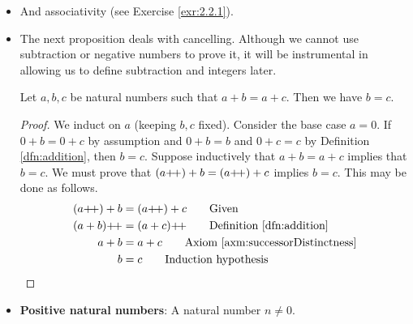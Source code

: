 \documentclass[../main.tex]{subfiles}
\begin{document}
\begin{itemize}
\begin{prp}
        For any natural numbers $n$ and $m$, $n+m=m+n$.
        \begin{proof}
            For all $m\in\N$, Definition \ref{dfn:addition} gives us $0+m=m$ and Lemma \ref{lem:nplus0} gives us $m+0=m$. Since both of the previous statements equal $m$, $0+m=m+0$. Suppose inductively that $n\in\N$ and $n+m=m+n$. If this is true, then
            \begin{align*}
                (n\pplus)+m &= (n+m)\pplus\tag*{Definition \ref{dfn:addition}}\\
                &= (m+n)\pplus\tag*{Induction hypothesis}\\
                &= m+(n\pplus)\tag*{Lemma \ref{lem:nplusmpplus}}
            \end{align*}
            This closes the induction.
        \end{proof}
    \end{prp}
    \item And associativity (see Exercise \ref{exr:2.2.1}).
    \item The next proposition deals with cancelling. Although we cannot use subtraction or negative numbers to prove it, it will be instrumental in allowing us to define subtraction and integers later.
    \begin{prp}\label{prp:cancellation}
        Let $a,b,c$ be natural numbers such that $a+b=a+c$. Then we have $b=c$.
        \begin{proof}
            We induct on $a$ (keeping $b,c$ fixed). Consider the base case $a=0$. If $0+b=0+c$ by assumption and $0+b=b$ and $0+c=c$ by Definition \ref{dfn:addition}, then $b=c$. Suppose inductively that $a+b=a+c$ implies that $b=c$. We must prove that $(a{+\!+})+b=(a{+\!+})+c$ implies $b=c$. This may be done as follows.
            \begin{align*}
                (a\pplus)+b &= (a\pplus)+c\tag*{Given}\\
                (a+b)\pplus &= (a+c)\pplus\tag*{Definition \ref{dfn:addition}}\\
                a+b &= a+c\tag*{Axiom \ref{axm:successorDistinctness}}\\
                b &= c\tag*{Induction hypothesis}
            \end{align*}
        \end{proof}
    \end{prp}
    \item \textbf{Positive natural numbers}: A natural number $n\neq 0$.
    \begin{prp}\label{prp:AplusBpositive}

\end{prp}
\end{itemize}
\end{document}
